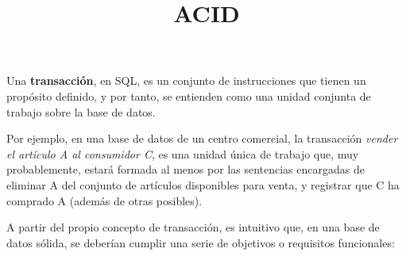 \documentclass[12pt, a4paper]{article}
\title{\fontsize{15pt}{0} ACID \vspace{-2ex}}
\date{\vspace{-5ex}}
\begin{document}
\maketitle
\thispagestyle{empty}

\vspace{-10ex}

Una \textbf{transacción}, en SQL, es un conjunto de instrucciones que tienen un propósito definido, y por tanto, se entienden como una unidad conjunta de trabajo sobre la base de datos.

Por ejemplo, en una base de datos de un centro comercial, la transacción \textit{vender el artículo A al consumidor C}, es una unidad única de trabajo que, muy probablemente, estará formada al menos por las sentencias encargadas de eliminar A del conjunto de artículos disponibles para venta, y registrar que C ha comprado A (además de otras posibles).

A partir del propio concepto de transacción, es intuitivo que, en una base de datos sólida, se deberían cumplir una serie de objetivos o requisitos funcionales:
\end{document}
